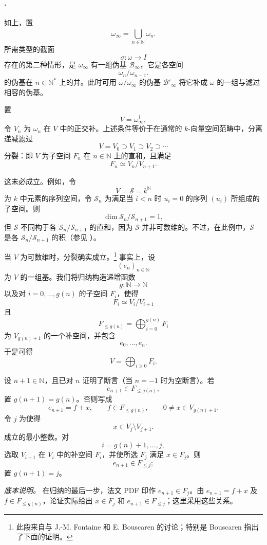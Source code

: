 
\paragraph{.}
\label{sga3:VIIB:5.2.1.B}

如上，置
\[
  \omega_\infty
  =
  \overline{\bigcup_{n\in\mathbb N}\omega_n}.
\]
所需类型的截面
\[
  \sigma:\omega\longrightarrow I
\]
存在的第二种情形，是 \(\omega_\infty\) 有一组伪基 \(\mathscr B_\infty\)，它是各空间
\[
  \omega_n/\omega_{n-1}.
\]
的伪基在 \(n\in\mathbb N^*\) 上的并。此时可用 \(\omega/\omega_\infty\) 的伪基 \(\mathscr B'_\infty\) 将它补成 \(\omega\) 的一组与滤过相容的伪基。

置
\[
  V=\omega_\infty^\dagger,
\]
令 \(V_n\) 为 \(\omega_n\) 在 \(V\) 中的正交补。上述条件等价于在通常的 \(k\)-向量空间范畴中，分离递减滤过
\[
  V=V_0\supset V_1\supset V_2\supset\cdots
\]
分裂：即 \(V\) 为子空间 \(F_n\) 在 \(n\in\mathbb N\) 上的直和，且满足
\[
  F_n\simeq V_n/V_{n+1}.
\]

这未必成立。例如，令
\[
  V=\mathscr S=k^{\mathbb N}
\]
为 \(k\) 中元素的序列空间，令 \(\mathscr S_n\) 为满足当 \(i<n\) 时 \(u_i=0\) 的序列 \((u_i)\) 所组成的子空间。则
\[
  \dim\mathscr S_n/\mathscr S_{n+1}=1,
\]
但 \(\mathscr S\) 不同构于各 \(\mathscr S_n/\mathscr S_{n+1}\) 的直和，因为 \(\mathscr S\) 并非可数维的。不过，在此例中，\(\mathscr S\) 是各 \(\mathscr S_n/\mathscr S_{n+1}\) 的积\textup{（参见 ）}。

当 \(V\) 为可数维时，分裂确实成立。\footnote{%
\label{sga3:VIIB:nde:156}此段来自与 J.-M. Fontaine 和 E. Bouscaren 的讨论；特别是 Bouscaren 指出了下面的证明。}
事实上，设
\[
  (e_n)_{n\in\mathbb N}
\]
为 \(V\) 的一组基。我们将归纳构造递增函数
\[
  g:\mathbb N\longrightarrow\mathbb N
\]
以及对 \(i=0,\ldots,g(n)\) 的子空间 \(F_i\)，使得
\[
  F_i\simeq V_i/V_{i+1}
\]
且
\[
  F_{\leq g(n)}
  =
  \bigoplus_{i=0}^{g(n)}F_i
\]
为 \(V_{g(n)+1}\) 的一个补空间，并包含
\[
  e_0,\ldots,e_n.
\]
于是可得
\[
  V=\bigoplus_{i\geq0}F_i.
\]

设 \(n+1\in\mathbb N\)，且已对 \(n\) 证明了断言\textup{（当 \(n=-1\) 时为空断言）}。若
\[
  e_{n+1}\in F_{\leq g(n)},
\]
置 \(g(n+1)=g(n)\)。否则写成
\[
  e_{n+1}=f+x,
  \qquad
  f\in F_{\leq g(n)},
  \qquad
  0\ne x\in V_{g(n)+1}.
\]
令 \(j\) 为使得
\[
  x\in V_j\setminus V_{j+1}.
\]
成立的最小整数。对
\[
  i=g(n)+1,\ldots,j,
\]
选取 \(V_{i+1}\) 在 \(V_i\) 中的补空间 \(F_i\)，并使所选 \(F_j\) 满足 \(x\in F_j\)。则
\[
  e_{n+1}\in F_{\leq j};
\]
置 \(g(n+1)=j\)。

\label{sga3:VIIB:5.2.1.B:induction-source-note}
\noindent\textit{底本说明。}\enspace
在归纳的最后一步，法文 PDF 印作 \(e_{n+1}\in F_j\)。由 \(e_{n+1}=f+x\) 及 \(f\in F_{\leq g(n)}\)，论证实际给出 \(x\in F_j\) 和 \(e_{n+1}\in F_{\leq j}\)；这里采用这些关系。
